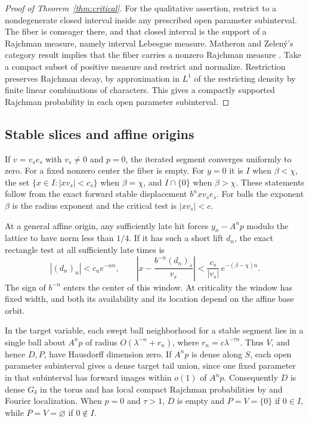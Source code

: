 \documentclass[11pt,a4paper,reqno]{amsart}
\theoremstyle{definition}
\theoremstyle{remark}
\numberwithin{equation}{section}
\begin{document}
\begin{proof}[Proof of Theorem~\ref{thm:critical}]
For the qualitative assertion, restrict to a nondegenerate closed
interval inside any prescribed open parameter subinterval. The
fiber is comeager there, and that closed interval is the support
of a Rajchman measure, namely interval Lebesgue measure.
Matheron and Zelený's category result implies that the fiber
carries a nonzero Rajchman measure
\cite[Corollary~4.5]{MZ}. Take a compact subset of positive
measure and restrict and normalize. Restriction preserves Rajchman
decay, by approximation in \(L^1\) of the restricting density by
finite linear combinations of characters. This gives a compactly
supported Rajchman probability in each open parameter subinterval.
\end{proof}

\subsection{Stable slices and affine origins}

If \(v=v_s e_s\) with \(v_s\ne0\) and \(p=0\), the iterated segment
converges uniformly to zero. For a fixed nonzero center the fiber
is empty. For \(y=0\) it is \(I\) when \(\beta<\chi\), the set
\(\{x\in I:|xv_s|<c_s\}\) when \(\beta=\chi\), and \(I\cap\{0\}\)
when \(\beta>\chi\). These statements follow from the exact forward
stable displacement \(b^n x v_s e_s\). For balls the exponent
\(\beta\) is the radius exponent and the critical test is
\(|xv_s|<c\).

At a general affine origin, any sufficiently late hit forces
\(y_n-A^n p\) modulo the lattice to have norm less than \(1/4\).
If it has such a short lift \(d_n\), the exact rectangle test at
all sufficiently late times is
\[
 |(d_n)_u|<c_u e^{-\alpha n},\qquad
 \left|x-\frac{b^{-n}(d_n)_s}{v_s}\right|
 <\frac{c_s}{|v_s|}\,e^{-(\beta-\chi)n}.
\]
The sign of \(b^{-n}\) enters the center of this window. At
criticality the window has fixed width, and both its availability
and its location depend on the affine base orbit.

In the target variable, each swept ball neighborhood for a stable
segment lies in a single ball about \(A^n p\) of radius
\(O(\lambda^{-n}+r_n)\), where \(r_n=c\lambda^{-\tau n}\).
Thus \(V\), and hence \(D,P\), have Hausdorff dimension zero.
If \(A^n p\) is dense along \(S\), each open parameter subinterval
gives a dense target tail union, since one fixed parameter in that
subinterval has forward images within \(o(1)\) of \(A^n p\).
Consequently \(D\) is dense \(G_\delta\) in the torus and has local
compact Rajchman probabilities by \cite[Corollary~4.5]{MZ} and
Fourier localization. When \(p=0\) and \(\tau>1\), \(D\) is empty
and \(P=V=\{0\}\) if \(0\in I\), while \(P=V=\varnothing\) if
\(0\notin I\).
\end{document}

